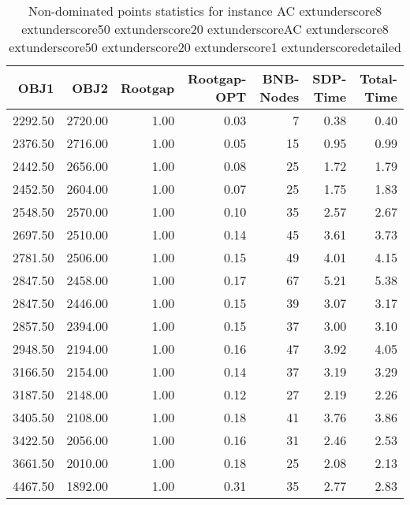 \begin{table}
\caption{Non-dominated points statistics for instance AC	extunderscore8	extunderscore50	extunderscore20	extunderscoreAC	extunderscore8	extunderscore50	extunderscore20	extunderscore1	extunderscoredetailed}
\label{tab:stats/AC_8_50_20_AC_8_50_20_1_detailed}
\begin{tabular}{rrrrrrr}
\toprule
OBJ1 & OBJ2 & Rootgap & Rootgap-OPT & BNB-Nodes & SDP-Time & Total-Time \\
\midrule
2292.50 & 2720.00 & 1.00 & 0.03 & 7 & 0.38 & 0.40 \\
2376.50 & 2716.00 & 1.00 & 0.05 & 15 & 0.95 & 0.99 \\
2442.50 & 2656.00 & 1.00 & 0.08 & 25 & 1.72 & 1.79 \\
2452.50 & 2604.00 & 1.00 & 0.07 & 25 & 1.75 & 1.83 \\
2548.50 & 2570.00 & 1.00 & 0.10 & 35 & 2.57 & 2.67 \\
2697.50 & 2510.00 & 1.00 & 0.14 & 45 & 3.61 & 3.73 \\
2781.50 & 2506.00 & 1.00 & 0.15 & 49 & 4.01 & 4.15 \\
2847.50 & 2458.00 & 1.00 & 0.17 & 67 & 5.21 & 5.38 \\
2847.50 & 2446.00 & 1.00 & 0.15 & 39 & 3.07 & 3.17 \\
2857.50 & 2394.00 & 1.00 & 0.15 & 37 & 3.00 & 3.10 \\
2948.50 & 2194.00 & 1.00 & 0.16 & 47 & 3.92 & 4.05 \\
3166.50 & 2154.00 & 1.00 & 0.14 & 37 & 3.19 & 3.29 \\
3187.50 & 2148.00 & 1.00 & 0.12 & 27 & 2.19 & 2.26 \\
3405.50 & 2108.00 & 1.00 & 0.18 & 41 & 3.76 & 3.86 \\
3422.50 & 2056.00 & 1.00 & 0.16 & 31 & 2.46 & 2.53 \\
3661.50 & 2010.00 & 1.00 & 0.18 & 25 & 2.08 & 2.13 \\
4467.50 & 1892.00 & 1.00 & 0.31 & 35 & 2.77 & 2.83 \\
\bottomrule
\end{tabular}
\end{table}
